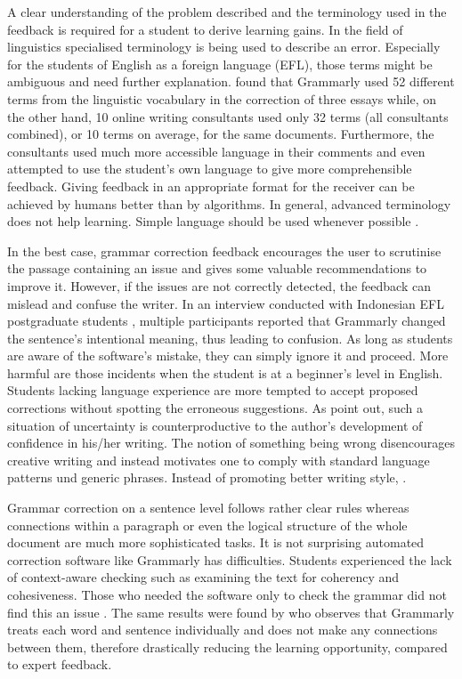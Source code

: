 \documentclass[runningheads]{llncs}
\let\OldTextregistered\textregistered
\renewcommand{\textregistered}{\OldTextregistered\xspace}
\begin{document}
A clear understanding of the problem described and the terminology used in the feedback is required for a student to derive learning gains. In the field of linguistics specialised terminology is being used to describe an error. Especially for the students of English as a foreign language (EFL), those terms might be ambiguous and need further explanation. \textcite{dembsey_closing_2017} found that Grammarly\textregistered used 52 different terms from the linguistic vocabulary in the correction of three essays while, on the other hand, 10 online writing consultants used only 32 terms (all consultants combined), or 10 terms on average, for the same documents. Furthermore, the consultants used much more accessible language in their comments and even attempted to use the student's own language to give more comprehensible feedback. Giving feedback in an appropriate format for the receiver can be achieved by humans better than by algorithms. In general, advanced terminology does not help learning. Simple language should be used whenever possible \citep{dembsey_closing_2017}.

In the best case, grammar correction feedback encourages the user to scrutinise the passage containing an issue and gives some valuable recommendations to improve it. However, if the issues are not correctly detected, the feedback can mislead and confuse the writer. In an interview conducted with Indonesian EFL postgraduate students \citep{nova_utilizing_2018}, multiple participants reported that Grammarly\textregistered changed the sentence's intentional meaning, thus leading to confusion. As long as students are aware of the software's mistake, they can simply ignore it and proceed. More harmful are those incidents when the student is at a beginner's level in English. Students lacking language experience are more tempted to accept proposed corrections without spotting the erroneous suggestions. As \textcite{vojak_new_2011} point out, such a situation of uncertainty is counterproductive to the author's development of confidence in his/her writing. The notion of something being wrong disencourages creative writing and instead motivates one to comply with standard language patterns und generic phrases. Instead of promoting better writing style, \citeauthor{vojak_new_2011} . 

Grammar correction on a sentence level follows rather clear rules whereas connections within a paragraph or even the logical structure of the whole document are much more sophisticated tasks. It is not surprising automated correction software like Grammarly\textregistered has difficulties. Students experienced the lack of context-aware checking such as examining the text for coherency and cohesiveness. Those who needed the software only to check the grammar did not find this an issue \citep{nova_utilizing_2018}. The same results were found by \textcite{dembsey_closing_2017} who observes that Grammarly\textregistered treats each word and sentence individually and does not make any connections between them, therefore drastically reducing the learning opportunity, compared to expert feedback.
\end{document}
